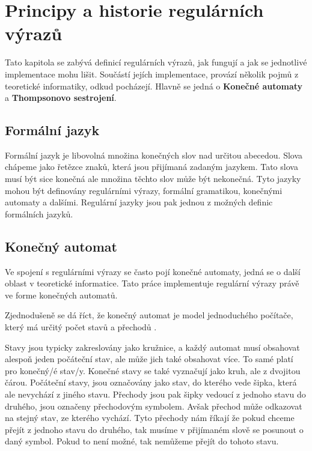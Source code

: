 \chapter{Principy a historie regulárních výrazů}\label{sec:Principle}

Tato kapitola se zabývá definicí regulárních výrazů, jak fungují a jak se jednotlivé implementace mohu lišit. 
Součástí jejích implementace, provází několik pojmů z teoretické informatiky, odkud pocházejí.
Hlavně se jedná o \textbf{Konečné automaty} a \textbf{Thompsonovo sestrojení}.




\section{Formální jazyk}
Formální jazyk je libovolná množina konečných slov nad určitou abecedou. 
Slova chápeme jako řetězce znaků, která jsou přijímaná zadaným jazykem.
Tato slova musí být sice konečná ale množina těchto slov může být nekonečná. 
Tyto jazyky mohou být definovány regulárními výrazy, formální gramatikou,
konečnými automaty a dalšími. Regulární jazyky jsou pak jednou z možných definic formálních jazyků.

\section{Konečný automat}\label{sec:FiniteAutomaton}
Ve spojení s regulárními výrazy se často pojí konečné automaty, jedná se o další oblast v teoretické informatice.
Tato práce implementuje regulární výrazy právě ve forme konečných automatů.

Zjednodušeně se dá říct, že konečný automat je model jednoduchého počítače, který má určitý počet stavů a přechodů \cite{Havrlant}. 

Stavy jsou typicky zakreslovány jako kružnice, a každý automat musí obsahovat alespoň jeden počáteční stav, ale může jich také obsahovat více. 
To samé platí pro konečný/é stav/y. 
Konečné stavy se také vyznačují jako kruh, ale z dvojitou čárou. 
Počáteční stavy, jsou označovány jako stav, do kterého vede šipka, která ale nevychází z jiného stavu.
Přechody jsou pak šipky vedoucí z jednoho stavu do druhého, jsou označeny přechodovým symbolem.
Avšak přechod může odkazovat na stejný stav, ze kterého vychází.
Tyto přechody nám říkají že pokud chceme přejít z jednoho stavu do druhého, tak musíme v přijímaném slově se posunout o daný symbol. 
Pokud to není možné, tak nemůžeme přejít do tohoto stavu.

